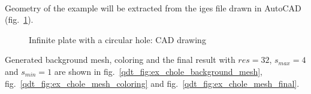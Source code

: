 \paragraph{}
Geometry of the example will be extracted from the iges file drawn in AutoCAD (fig.~\ref{qdt_fig:ex_chole_cad}).
    \begin{figure}[H]
        \centering
        \caption{Infinite plate with a circular hole: CAD drawing}
        \label{qdt_fig:ex_chole_cad}        
    \end{figure}


Generated background mesh, coloring and the final result with $res=32$, $s_{max}=4$ and $s_{min}=1$ are shown in fig.~\ref{qdt_fig:ex_chole_background_mesh}, fig.~\ref{qdt_fig:ex_chole_mesh_coloring} and fig.~\ref{qdt_fig:ex_chole_mesh_final}.

